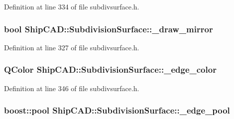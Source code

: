 Definition at line 334 of file subdivsurface.\-h.

\hypertarget{classShipCAD_1_1SubdivisionSurface_a4ee73ae98bddfe1819419afd1d5ba029}{
\subsubsection[{\-\_\-draw\-\_\-mirror}]{\setlength{\rightskip}{0pt plus 5cm}bool Ship\-C\-A\-D\-::\-Subdivision\-Surface\-::\-\_\-draw\-\_\-mirror\hspace{0.3cm}{\ttfamily [protected]}}}\label{classShipCAD_1_1SubdivisionSurface_a4ee73ae98bddfe1819419afd1d5ba029}


Definition at line 327 of file subdivsurface.\-h.

\hypertarget{classShipCAD_1_1SubdivisionSurface_aced3b075062f92e55b3a89729cad3fd2}{
\subsubsection[{\-\_\-edge\-\_\-color}]{\setlength{\rightskip}{0pt plus 5cm}Q\-Color Ship\-C\-A\-D\-::\-Subdivision\-Surface\-::\-\_\-edge\-\_\-color\hspace{0.3cm}{\ttfamily [protected]}}}\label{classShipCAD_1_1SubdivisionSurface_aced3b075062f92e55b3a89729cad3fd2}


Definition at line 346 of file subdivsurface.\-h.

\hypertarget{classShipCAD_1_1SubdivisionSurface_a7a7e25c91a06ca2b3f3d27a5ca310f08}{
\subsubsection[{\-\_\-edge\-\_\-pool}]{\setlength{\rightskip}{0pt plus 5cm}boost\-::pool Ship\-C\-A\-D\-::\-Subdivision\-Surface\-::\-\_\-edge\-\_\-pool\hspace{0.3cm}{\ttfamily [protected]}}}\label{classShipCAD_1_1SubdivisionSurface_a7a7e25c91a06ca2b3f3d27a5ca310f08}


